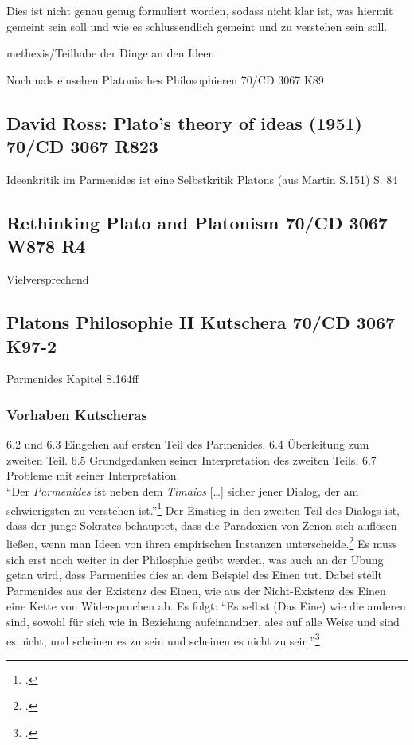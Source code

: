 \documentclass[12pt]{article}
\begin{document}
Dies ist nicht genau genug formuliert worden, sodass nicht klar ist, was hiermit gemeint sein soll und wie es schlussendlich gemeint und zu verstehen sein soll.

methexis/Teilhabe der Dinge an den Ideen


Nochmals einsehen Platonisches Philosophieren 70/CD 3067 K89

\subsection*{David Ross: Plato's theory of ideas (1951) 70/CD 3067 R823}
Ideenkritik im Parmenides ist eine Selbstkritik Platons (aus Martin S.151) S. 84



\subsection*{Rethinking Plato and Platonism 70/CD 3067 W878 R4 }
Vielversprechend

\subsection*{Platons Philosophie II Kutschera 70/CD 3067 K97-2}
Parmenides Kapitel S.164ff
\subsubsection*{Vorhaben Kutscheras}
6.2 und 6.3 Eingehen auf ersten Teil des Parmenides. 6.4 Überleitung zum zweiten Teil. 6.5 Grundgedanken seiner Interpretation des zweiten Teils. 6.7 Probleme mit seiner Interpretation.\\
\enquote{Der \emph{Parmenides} ist neben dem \emph{Timaios} [\dots] sicher jener Dialog, der am schwierigsten zu verstehen ist.}\footcite[][S. 161]{Kutschera}
Der Einstieg in den zweiten Teil des Dialogs ist, dass der junge Sokrates behauptet, dass die Paradoxien von Zenon sich auflösen ließen, wenn man Ideen von ihren empirischen Instanzen unterscheide.\footcite[vgl.][S. 161]{Kutschera}
Es muss sich erst noch weiter in der Philosphie geübt werden, was auch an der Übung getan wird, dass Parmenides dies an dem Beispiel des Einen tut. Dabei stellt Parmenides aus der Existenz des Einen, wie aus der Nicht-Existenz des Einen eine Kette von Widerspruchen ab. Es folgt: \enquote{Es selbst (Das Eine) wie die anderen sind, sowohl für sich wie in Beziehung aufeinandner, ales auf alle Weise und sind es nicht, und scheinen es zu sein und scheinen es nicht zu sein.}\footcite[vgl.][S. 162]{Kutschera}
\end{document}
